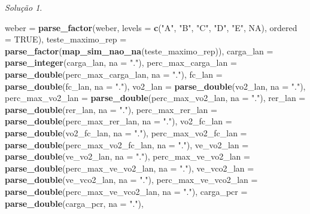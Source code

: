 \documentclass[
]{latex/krantz}
\newenvironment{Shaded}{\begin{snugshade}}{\end{snugshade}}
\newcommand{\AttributeTok}[1]{\textcolor[rgb]{0.13,0.29,0.53}{#1}}
\newcommand{\ConstantTok}[1]{\textcolor[rgb]{0.56,0.35,0.01}{#1}}
\newcommand{\FunctionTok}[1]{\textcolor[rgb]{0.13,0.29,0.53}{\textbf{#1}}}
\newcommand{\NormalTok}[1]{#1}
\newcommand{\StringTok}[1]{\textcolor[rgb]{0.31,0.60,0.02}{#1}}
\theoremstyle{definition}
\theoremstyle{definition}
\theoremstyle{definition}
\theoremstyle{definition}
\theoremstyle{remark}
\newtheorem*{solution}{Solução}
\begin{document}
\begin{solution}
\begin{Shaded}
\begin{Highlighting}[]
                \AttributeTok{weber =} \FunctionTok{parse\_factor}\NormalTok{(weber, }\AttributeTok{levels =} \FunctionTok{c}\NormalTok{(}\StringTok{"A"}\NormalTok{, }\StringTok{"B"}\NormalTok{, }\StringTok{"C"}\NormalTok{, }\StringTok{"D"}\NormalTok{, }\StringTok{"E"}\NormalTok{, }\ConstantTok{NA}\NormalTok{), }\AttributeTok{ordered =} \ConstantTok{TRUE}\NormalTok{),}
                \AttributeTok{teste\_maximo\_rep =} \FunctionTok{parse\_factor}\NormalTok{(}\FunctionTok{map\_sim\_nao\_na}\NormalTok{(teste\_maximo\_rep)),}
                \AttributeTok{carga\_lan =} \FunctionTok{parse\_integer}\NormalTok{(carga\_lan, }\AttributeTok{na =} \StringTok{"."}\NormalTok{),}
                \AttributeTok{perc\_max\_carga\_lan =} \FunctionTok{parse\_double}\NormalTok{(perc\_max\_carga\_lan, }\AttributeTok{na =} \StringTok{"."}\NormalTok{),}
                \AttributeTok{fc\_lan =} \FunctionTok{parse\_double}\NormalTok{(fc\_lan, }\AttributeTok{na =} \StringTok{"."}\NormalTok{),}
                \AttributeTok{vo2\_lan =} \FunctionTok{parse\_double}\NormalTok{(vo2\_lan, }\AttributeTok{na =} \StringTok{"."}\NormalTok{),}
                \AttributeTok{perc\_max\_vo2\_lan =} \FunctionTok{parse\_double}\NormalTok{(perc\_max\_vo2\_lan, }\AttributeTok{na =} \StringTok{"."}\NormalTok{),}
                \AttributeTok{rer\_lan =} \FunctionTok{parse\_double}\NormalTok{(rer\_lan, }\AttributeTok{na =} \StringTok{"."}\NormalTok{),}
                \AttributeTok{perc\_max\_rer\_lan =} \FunctionTok{parse\_double}\NormalTok{(perc\_max\_rer\_lan, }\AttributeTok{na =} \StringTok{"."}\NormalTok{),}
                \AttributeTok{vo2\_fc\_lan =} \FunctionTok{parse\_double}\NormalTok{(vo2\_fc\_lan, }\AttributeTok{na =} \StringTok{"."}\NormalTok{),}
                \AttributeTok{perc\_max\_vo2\_fc\_lan =} \FunctionTok{parse\_double}\NormalTok{(perc\_max\_vo2\_fc\_lan, }\AttributeTok{na =} \StringTok{"."}\NormalTok{),}
                \AttributeTok{ve\_vo2\_lan =} \FunctionTok{parse\_double}\NormalTok{(ve\_vo2\_lan, }\AttributeTok{na =} \StringTok{"."}\NormalTok{),}
                \AttributeTok{perc\_max\_ve\_vo2\_lan =} \FunctionTok{parse\_double}\NormalTok{(perc\_max\_ve\_vo2\_lan, }\AttributeTok{na =} \StringTok{"."}\NormalTok{),}
                \AttributeTok{ve\_vco2\_lan =} \FunctionTok{parse\_double}\NormalTok{(ve\_vco2\_lan, }\AttributeTok{na =} \StringTok{"."}\NormalTok{),}
                \AttributeTok{perc\_max\_ve\_vco2\_lan =} \FunctionTok{parse\_double}\NormalTok{(perc\_max\_ve\_vco2\_lan, }\AttributeTok{na =} \StringTok{"."}\NormalTok{),}
                \AttributeTok{carga\_pcr =} \FunctionTok{parse\_double}\NormalTok{(carga\_pcr, }\AttributeTok{na =} \StringTok{"."}\NormalTok{),}

\end{Highlighting}
\end{Shaded}
\end{solution}
\end{document}
